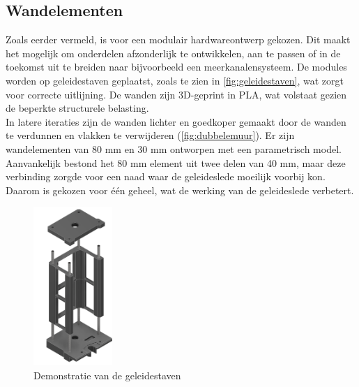 \subsection{Wandelementen}
Zoals eerder vermeld, is voor een modulair hardwareontwerp gekozen. Dit maakt het mogelijk om onderdelen afzonderlijk te ontwikkelen, aan te passen of in de toekomst uit te breiden naar bijvoorbeeld een meerkanalensysteem. De modules worden op geleidestaven geplaatst, zoals te zien in \autoref{fig:geleidestaven}, wat zorgt voor correcte uitlijning.
De wanden zijn 3D-geprint in PLA, wat volstaat gezien de beperkte structurele belasting. 
\\[12pt]In latere iteraties zijn de wanden lichter en goedkoper gemaakt door de wanden te verdunnen en vlakken te verwijderen (\autoref{fig:dubbelemuur}). Er zijn wandelementen van 80 mm en 30 mm ontworpen met een parametrisch model. Aanvankelijk bestond het 80 mm element uit twee delen van 40 mm, maar deze verbinding zorgde voor een naad waar de geleideslede moeilijk voorbij kon. Daarom is gekozen voor één geheel, wat de werking van de geleideslede verbetert.
\\[12pt]\begin{minipage}[t]{0.49\textwidth}
    \vspace{0pt}
    \begin{figure}[H]
        \centering
        \captionsetup{width=1\textwidth} %
        \includegraphics[height=6cm]{figures/GuidesDemonstration_2.png}
        \caption{Demonstratie van de geleidestaven}\label{fig:geleidestaven}
    \end{figure}
\end{minipage}
